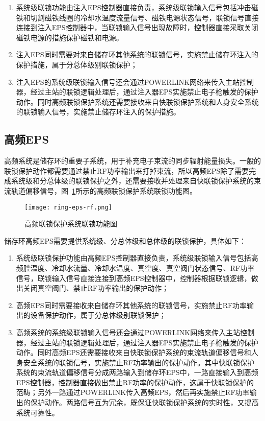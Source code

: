\begin{enumerate}
  \item 系统级联锁功能由注入EPS控制器直接负责，系统级联锁输入信号包括冲击磁铁和切割磁铁线圈的冷却水温度流量信号、磁铁电源状态信号，联锁信号直接连接到注入EPS控制器中，当联锁输入信号出现故障时，控制器直接采取关闭磁铁电源的措施保护磁铁和电源。

  \item 注入EPS同时需要对来自储存环其他系统的联锁信号，实施禁止储存环注入的保护措施，属于分总体级别联锁保护；

  \item 注入EPS的系统级联锁输入信号还会通过POWERLINK网络来传入主站控制器，经过主站的联锁逻辑处理后，通过注入器EPS实施禁止电子枪触发的保护动作。同时高频联锁保护系统还需要接收来自快联锁保护系统和人身安全系统的联锁输入信号，实施禁止储存环注入的保护措施。
\end{enumerate}

\subsection{高频EPS}

高频系统是储存环的重要子系统，用于补充电子束流的同步辐射能量损失。一般的联锁保护动作都需要通过禁止RF功率输出来打掉束流，所以高频EPS除了需要完成系统级和分总体级的联锁保护之外，还需要接收并处理来自快联锁保护系统的束流轨道偏移信号，图~\ref{fig:ring-eps-rf}所示的高频联锁保护系统联锁功能图。

\begin{figure}[!htb]
	\centering
	\texttt{[image: ring-eps-rf.png]}
	\caption{高频联锁保护系统联锁功能图}
	\label{fig:ring-eps-rf}
\end{figure}

储存环高频EPS需要提供系统级、分总体级和总体级的联锁保护，具体如下：

\begin{enumerate}
  \item 系统级联锁保护功能由高频EPS控制器直接负责，系统级联锁输入信号包括高频腔温度、冷却水流量、冷却水温度、真空度、真空阀门状态信号、RF功率信号，联锁输入信号直接连接到高频EPS控制器中，控制器根据联锁逻辑，做出关闭真空阀门、禁止RF功率输出的保护动作；

  \item 高频EPS同时需要接收来自储存环其他系统的联锁信号，实施禁止RF功率输出的设备保护动作，属于分总体级别联锁保护；

  \item 高频系统的系统级联锁输入信号还会通过POWERLINK网络来传入主站控制器，经过主站的联锁逻辑处理后，通过注入器EPS实施禁止电子枪触发的保护动作。同时高频EPS还需要接收来自快联锁保护系统的束流轨道偏移信号和人身安全系统的联锁信号，实施禁止RF功率输出的保护动作。其中快联锁保护系统的束流轨道偏移信号分成两路输入到储存环EPS中，一路直接输入到高频EPS控制器，控制器直接做出禁止RF功率的保护动作，这属于快联锁保护的范畴；另外一路通过POWERLINK传入高频EPS，然后再实施禁止RF功率输出的保护动作。两路信号互为冗余，既保证快联锁保护系统的实时性，又提高系统可靠性。
\end{enumerate}

